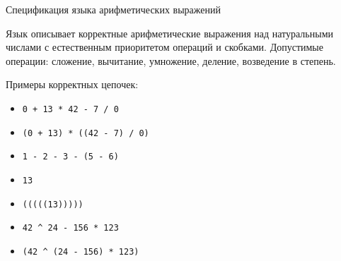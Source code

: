 \documentclass{article}
\begin{document}
\begin{center} {\Large Спецификация языка арифметических выражений } \end{center}

\medskip

Язык описывает корректные арифметические выражения над натуральными числами с естественным приоритетом операций и скобками. Допустимые операции: сложение, вычитание, умножение, деление, возведение в степень. 

Примеры корректных цепочек: 

\begin{itemize}
  \item \verb!0 + 13 * 42 - 7 / 0!
  \item \verb!(0 + 13) * ((42 - 7) / 0)!
  \item \verb!1 - 2 - 3 - (5 - 6)!
  \item \verb!13!
  \item \verb!(((((13)))))!
  \item \verb!42 ^ 24 - 156 * 123!
  \item \verb!(42 ^ (24 - 156) * 123)!
\end{itemize}
\end{document}
